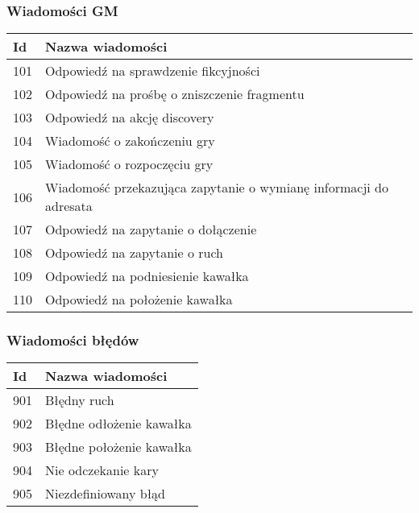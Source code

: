 \documentclass[Dokumentacja.tex]{subfiles}
\begin{document}
\subsubsection{Wiadomości GM}
\begin{tabular}{ |p{1cm}|p{12cm}| }
 \hline
 Id & Nazwa wiadomości \\
 \hline
 101 & Odpowiedź na sprawdzenie fikcyjności \\
 102 & Odpowiedź na prośbę o zniszczenie fragmentu \\
 103 & Odpowiedź na akcję discovery \\
 104 & Wiadomość o zakończeniu gry \\
 105 & Wiadomość o rozpoczęciu gry \\
 106 & Wiadomość przekazująca zapytanie o wymianę informacji do adresata \\
 107 & Odpowiedź na zapytanie o dołączenie \\
 108 & Odpowiedź na zapytanie o ruch \\
 109 & Odpowiedź na podniesienie kawałka \\
 110 & Odpowiedź na położenie kawałka \\
 \hline
\end{tabular}

\subsubsection{Wiadomości błędów}
\begin{tabular}{ |p{1cm}|p{12cm}| }
 \hline
 Id & Nazwa wiadomości \\
 \hline
 901 & Błędny ruch \\
 902 & Błędne odłożenie kawałka \\
 903 & Błędne położenie kawałka \\
 904 & Nie odczekanie kary \\
 905 & Niezdefiniowany błąd \\
 \hline
\end{tabular}
\end{document}
